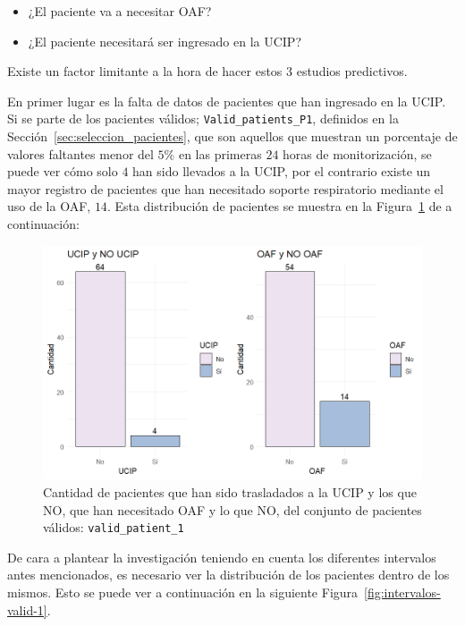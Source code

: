 \begin{itemize}
    \item ¿El paciente va a necesitar OAF?
    \item ¿El paciente necesitará ser ingresado en la UCIP?
\end{itemize}

Existe un factor limitante a la hora de hacer estos $3$ estudios predictivos.

En primer lugar es la falta de datos de pacientes que han ingresado en la UCIP. Si se parte de los pacientes válidos; \texttt{Valid\_patients\_P1}, definidos en la Sección~\ref{sec:seleccion_pacientes}, que son aquellos que muestran un porcentaje de valores faltantes menor del $5\%$ en las primeras $24$ horas de monitorización, se puede ver cómo solo $4$ han sido llevados a la UCIP, por el contrario existe un mayor registro de pacientes que han necesitado soporte respiratorio mediante el uso de la OAF, $14$. Esta distribución de pacientes se muestra en la Figura~\ref{fig:bar-OAF-UCIP-valid-1} de a continuación: 

\begin{figure}[H]
    \centering
    \includegraphics[scale = 0.9]{./img/bar-OAF-UCIP-valid-1.png}
    \caption{Cantidad de pacientes que han sido trasladados a la UCIP y los que NO, que han necesitado OAF y lo que NO, del conjunto de pacientes válidos: \texttt{valid\_patient\_1}}
    \label{fig:bar-OAF-UCIP-valid-1}
\end{figure}

De cara a plantear la investigación teniendo en cuenta los diferentes intervalos antes mencionados, es necesario ver la distribución de los pacientes dentro de los mismos. Esto se puede ver a continuación en la siguiente Figura~\ref{fig:intervalos-valid-1}.

